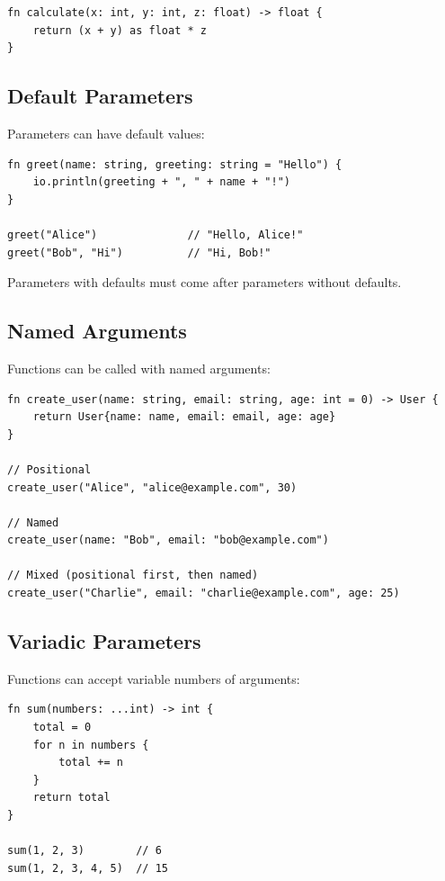 \begin{lstlisting}
fn calculate(x: int, y: int, z: float) -> float {
    return (x + y) as float * z
}
\end{lstlisting}

\subsection{Default Parameters}

Parameters can have default values:

\begin{lstlisting}
fn greet(name: string, greeting: string = "Hello") {
    io.println(greeting + ", " + name + "!")
}

greet("Alice")              // "Hello, Alice!"
greet("Bob", "Hi")          // "Hi, Bob!"
\end{lstlisting}

\begin{note}
Parameters with defaults must come after parameters without defaults.
\end{note}

\subsection{Named Arguments}

Functions can be called with named arguments:

\begin{lstlisting}
fn create_user(name: string, email: string, age: int = 0) -> User {
    return User{name: name, email: email, age: age}
}

// Positional
create_user("Alice", "alice@example.com", 30)

// Named
create_user(name: "Bob", email: "bob@example.com")

// Mixed (positional first, then named)
create_user("Charlie", email: "charlie@example.com", age: 25)
\end{lstlisting}

\subsection{Variadic Parameters}

Functions can accept variable numbers of arguments:

\begin{lstlisting}
fn sum(numbers: ...int) -> int {
    total = 0
    for n in numbers {
        total += n
    }
    return total
}

sum(1, 2, 3)        // 6
sum(1, 2, 3, 4, 5)  // 15
\end{lstlisting}

